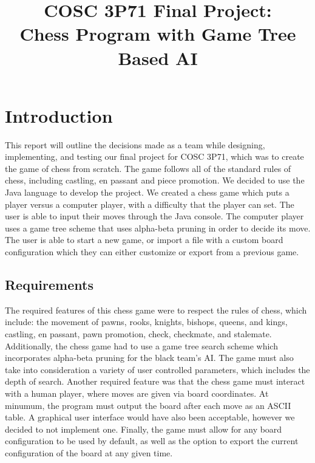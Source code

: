 \documentclass[conference]{IEEEtran}
\begin{document}
\title{COSC 3P71 Final Project: \\ Chess Program with Game Tree Based AI}

\author{
	\and
	}

\maketitle

\section{Introduction}
This report will outline the decisions made as a team while designing, implementing, and testing our final project for COSC 3P71, which was to create the game of chess from scratch. The game follows all of the standard rules of chess, including castling, en passant and piece promotion. We decided to use the Java language to develop the project. We created a chess game which puts a player versus a computer player, with a difficulty that the player can set. The user is able to input their moves through the Java console. The computer player uses a game tree scheme that uses alpha-beta pruning in order to decide its move. The user is able to start a new game, or import a file with a custom board configuration which they can either customize or export from a previous game.

\subsection{Requirements}
The required features of this chess game were to respect the rules of chess, which include: the movement of pawns, rooks, knights, bishops, queens, and kings, castling, en passant, pawn promotion, check, checkmate, and stalemate. Additionally, the chess game had to use a game tree search scheme which incorporates alpha-beta pruning for the black team's AI. The game must also take into consideration a variety of user controlled parameters, which includes the depth of search. Another required feature was that the chess game must interact with a human player, where moves are given via board coordinates. At minumum, the program must output the board after each move as an ASCII table. A graphical user interface would have also been acceptable, however we decided to not implement one. Finally, the game must allow for any board configuration to be used by default, as well as the option to export the current configuration of the board at any given time.
\end{document}
